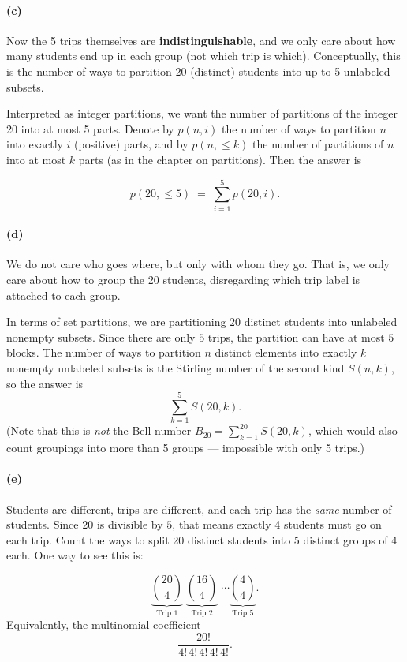 \documentclass[docmute]{article}
\begin{document}
\paragraph{(c)}
Now the 5 trips themselves are \textbf{indistinguishable}, and we only care about how many students end up in each group (not which trip is which). Conceptually, this is the number of ways to partition 20 (distinct) students into up to 5 unlabeled subsets.

Interpreted as integer partitions, we want the number of partitions of the integer 20 into at most 5 parts. Denote by \(p(n, i)\) the number of ways to partition \(n\) into exactly \(i\) (positive) parts, and by \(p(n,\le k)\) the number of partitions of \(n\) into at most \(k\) parts (as in the chapter on partitions). Then the answer is

\[
p(20,\le 5) \;=\; \sum_{i=1}^{5} p(20, i).
\]


\paragraph{(d)}
We do not care who goes where, but only with whom they go. That is, we only care about how to group the 20 students, disregarding which trip label is attached to each group.

In terms of set partitions, we are partitioning \(20\) distinct students into unlabeled nonempty subsets.  Since there are only \(5\) trips, the partition can have at most \(5\) blocks.  The number of ways to partition \(n\) distinct elements into exactly \(k\) nonempty unlabeled subsets is the Stirling number of the second kind \(S(n,k)\), so the answer is
\[
\sum_{k=1}^{5} S(20, k).
\]
(Note that this is \emph{not} the Bell number \(B_{20} = \sum_{k=1}^{20} S(20,k)\), which would also count groupings into more than 5 groups --- impossible with only 5 trips.)

\paragraph{(e)} 
Students are different, trips are different, and each trip has the \emph{same} number of students. Since \(20\) is divisible by \(5\), that means exactly 4 students must go on each trip. Count the ways to split 20 distinct students into 5 distinct groups of 4 each. One way to see this is:

\[
\underbrace{\binom{20}{4}}_{\text{Trip 1}} \;
\underbrace{\binom{16}{4}}_{\text{Trip 2}} \; 
\cdots 
\underbrace{\binom{4}{4}}_{\text{Trip 5}}.
\]
Equivalently, the multinomial coefficient
\[
\frac{20!}{4!\,4!\,4!\,4!\,4!}.
\]
\end{document}
